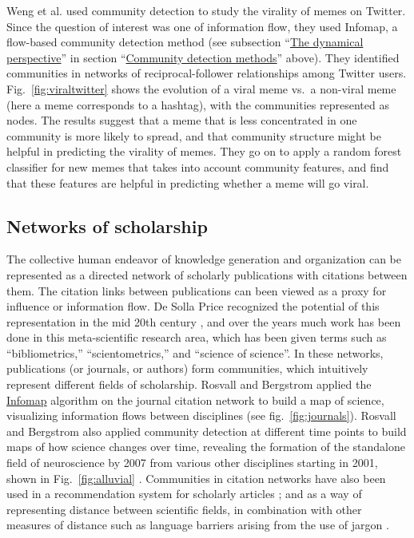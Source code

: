 Weng et al. \autocite{weng_virality_2013} used community detection to
study the virality of memes on Twitter. Since the question of interest
was one of information flow, they used Infomap, a flow-based community
detection method (see subsection
``\protect\hyperlink{the-dynamical-perspective}{The dynamical
perspective}'' in section
``\protect\hyperlink{community-detection-methods}{Community detection
methods}'' above). They identified communities in networks of
reciprocal-follower relationships among Twitter users.
Fig.~\ref{fig:viraltwitter} shows the evolution of a viral meme vs.~a
non-viral meme (here a meme corresponds to a hashtag), with the
communities represented as nodes. The results suggest that a meme that
is less concentrated in one community is more likely to spread, and that
community structure might be helpful in predicting the virality of
memes. They go on to apply a random forest classifier for new memes that
takes into account community features, and find that these features are
helpful in predicting whether a meme will go viral.

\hypertarget{networks-of-scholarship}{\subsection{Networks of
scholarship}\label{networks-of-scholarship}}

\protect\hyperlink{networks-of-scholarship}{}

The collective human endeavor of knowledge generation and organization
can be represented as a directed network of scholarly publications with
citations between them. The citation links between publications can been
viewed as a proxy for influence or information flow. De Solla Price
recognized the potential of this representation in the mid 20th century
\autocite{de_solla_price_networks_1965}, and over the years much work
has been done in this meta-scientific research area, which has been
given terms such as ``bibliometrics,'' ``scientometrics,'' and ``science
of science''. In these networks, publications (or journals, or authors)
form communities, which intuitively represent different fields of
scholarship. Rosvall and Bergstrom \autocite{rosvall_maps_2008} applied
the \protect\hyperlink{the-dynamical-perspective}{Infomap} algorithm on
the journal citation network to build a map of science, visualizing
information flows between disciplines (see fig.~\ref{fig:journals}).
Rosvall and Bergstrom also applied community detection at different time
points to build maps of how science changes over time, revealing the
formation of the standalone field of neuroscience by 2007 from various
other disciplines starting in 2001, shown in Fig.~\ref{fig:alluvial}
\autocite{rosvall_mapping_2010}. Communities in citation networks have
also been used in a recommendation system for scholarly articles
\autocite{west_recommendation_2016}; and as a way of representing
distance between scientific fields, in combination with other measures
of distance such as language barriers arising from the use of jargon
\autocite{vilhena_finding_2014}.

